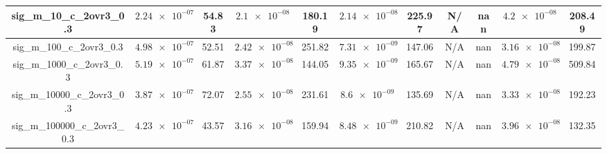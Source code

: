 \documentclass{article}%
\begin{document}
\begin{tabular}{|c||c|c|c|c|c|c|c|c|c|c|}
\hline%
sig\_m\_10\_c\_2ovr3\_0.3&$\num{2.24e-07}$&54.83&$\num{2.1e-08}$&180.19&$\num{2.14e-08}$&225.97&N/A&nan&$\num{4.2e-08}$&208.49\\%
\hline%
sig\_m\_100\_c\_2ovr3\_0.3&$\num{4.98e-07}$&52.51&$\num{2.42e-08}$&251.82&$\num{7.31e-09}$&147.06&N/A&nan&$\num{3.16e-08}$&199.87\\%
\hline%
sig\_m\_1000\_c\_2ovr3\_0.3&$\num{5.19e-07}$&61.87&$\num{3.37e-08}$&144.05&$\num{9.35e-09}$&165.67&N/A&nan&$\num{4.79e-08}$&509.84\\%
\hline%
sig\_m\_10000\_c\_2ovr3\_0.3&$\num{3.87e-07}$&72.07&$\num{2.55e-08}$&231.61&$\num{8.6e-09}$&135.69&N/A&nan&$\num{3.33e-08}$&192.23\\%
\hline%
sig\_m\_100000\_c\_2ovr3\_0.3&$\num{4.23e-07}$&43.57&$\num{3.16e-08}$&159.94&$\num{8.48e-09}$&210.82&N/A&nan&$\num{3.96e-08}$&132.35\\%
\hline%
\hline%
\end{tabular}%
\newline%
\end{document}
